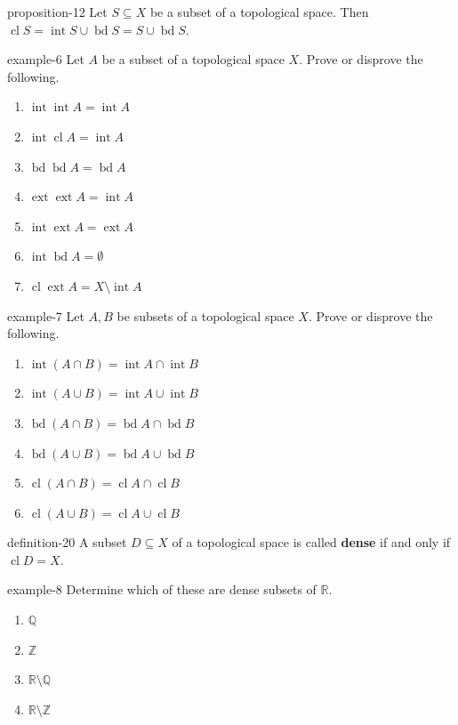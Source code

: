 \documentclass[10pt,]{article}
\newcommand{\terminology}[1]{\textbf{#1}}
\newcommand{\mb}{\mathbb}
\newcommand{\cl}{\operatorname{cl}}
\newcommand{\int}{\operatorname{int}}
\newcommand{\ext}{\operatorname{ext}}
\newcommand{\bd}{\operatorname{bd}}
\begin{document}
\begin{proposition}{}{}{proposition-12}%
\hypertarget{p-62}{}%
Let \(S\subseteq X\) be a subset of a topological space. Then \(\cl S=\int S\cup\bd S=S\cup\bd S\).%
\end{proposition}
\begin{example}{}{example-6}%
\hypertarget{p-63}{}%
Let \(A\) be a subset of a topological space \(X\). Prove or disprove the following.%
\leavevmode%
\begin{enumerate}
\item\hypertarget{li-42}{}\(\int\int A=\int A\)%
\item\hypertarget{li-43}{}\(\int\cl A=\int A\)%
\item\hypertarget{li-44}{}\(\bd\bd A=\bd A\)%
\item\hypertarget{li-45}{}\(\ext\ext A=\int A\)%
\item\hypertarget{li-46}{}\(\int\ext A=\ext A\)%
\item\hypertarget{li-47}{}\(\int\bd A=\emptyset\)%
\item\hypertarget{li-48}{}\(\cl\ext A=X\setminus\int A\)%
\end{enumerate}
\end{example}
\begin{example}{}{example-7}%
\hypertarget{p-64}{}%
Let \(A,B\) be subsets of a topological space \(X\). Prove or disprove the following.%
\leavevmode%
\begin{enumerate}
\item\hypertarget{li-49}{}\(\int(A\cap B)=\int A\cap\int B\)%
\item\hypertarget{li-50}{}\(\int(A\cup B)=\int A\cup\int B\)%
\item\hypertarget{li-51}{}\(\bd(A\cap B)=\bd A\cap\bd B\)%
\item\hypertarget{li-52}{}\(\bd(A\cup B)=\bd A\cup\bd B\)%
\item\hypertarget{li-53}{}\(\cl(A\cap B)=\cl A\cap\cl B\)%
\item\hypertarget{li-54}{}\(\cl(A\cup B)=\cl A\cup\cl B\)%
\end{enumerate}
\end{example}
\begin{definition}{}{definition-20}%
\hypertarget{p-65}{}%
A subset \(D\subseteq X\) of a topological space is called \terminology{dense} if and only if \(\cl D=X\).%
\end{definition}
\begin{example}{}{example-8}%
\hypertarget{p-66}{}%
Determine which of these are dense subsets of \(\mb R\).%
\leavevmode%
\begin{enumerate}
\item\hypertarget{li-55}{}\(\mb Q\)%
\item\hypertarget{li-56}{}\(\mb Z\)%
\item\hypertarget{li-57}{}\(\mb R\setminus\mb Q\)%
\item\hypertarget{li-58}{}\(\mb R\setminus\mb Z\)%
\end{enumerate}
\end{example}
\end{document}
